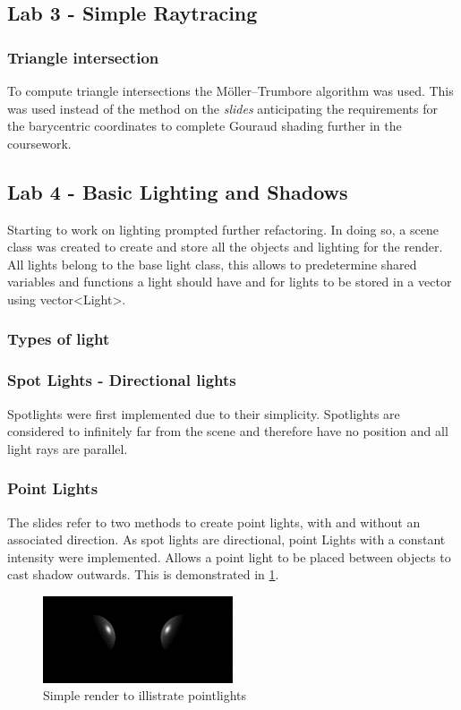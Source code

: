 \documentclass{article}
\begin{document}
\subsection{Lab 3 - Simple Raytracing}
\subsubsection{Triangle intersection}
To compute triangle intersections the Möller–Trumbore algorithm was used. This was used instead of the method on the \textit{slides} anticipating the requirements for the barycentric coordinates to complete Gouraud shading further in the coursework.

\subsection{Lab 4 - Basic Lighting and Shadows}
Starting to work on lighting prompted further refactoring. In doing so, a scene class was created to create and store all the objects and lighting for the render. All lights belong to the base light class, this allows to predetermine shared variables and functions a light should have and for lights to be stored in a vector using vector<Light>.
\subsubsection{Types of light}
\subsubsection{Spot Lights - Directional lights}
Spotlights were first implemented due to their simplicity. Spotlights are considered to infinitely far from the scene and therefore have no position and all light rays are parallel.

\subsubsection{Point Lights}
The slides refer to two methods to create point lights, with and without an associated direction. As spot lights are directional, point Lights with a constant intensity were implemented. Allows a point light to be placed between objects to cast shadow outwards. This is demonstrated in \ref{fig:pointlight_white}. 
\begin{figure}[h]
\includegraphics[width=0.5\textwidth]{pointlight}
\captionsetup{justification=centering,margin=0.5cm}
\caption{Simple render to illistrate pointlights}
\label{fig:pointlight_white}
\end{figure}
\end{document}
